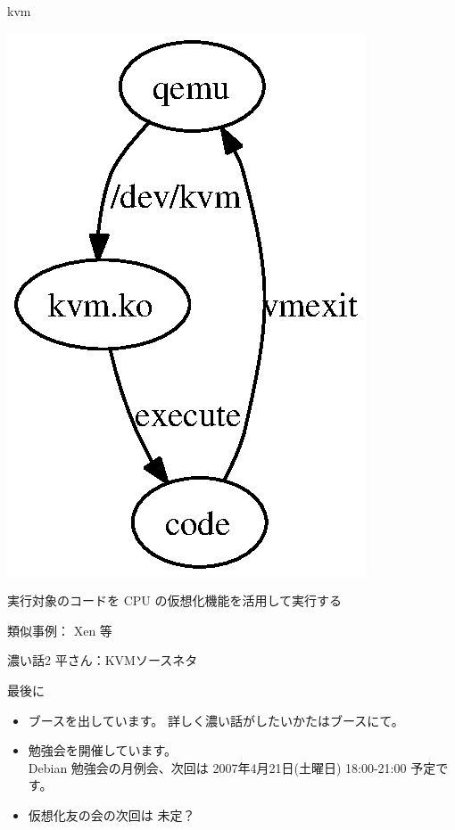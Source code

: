\documentclass[cjk,dvipdfmx]{beamer}
\begin{document}
\begin{frame}{kvm}
\begin{minipage}[]{0.4\hsize}
 \includegraphics[width=0.9\hsize]{image200703/kvm.eps}
\end{minipage}
\begin{minipage}[]{0.55\hsize}
 実行対象のコードを CPU の仮想化機能を活用して実行する

類似事例：
 Xen 等
\end{minipage}
\end{frame}

\begin{frame}{濃い話2}
 平さん：KVMソースネタ
\end{frame}

\begin{frame}{最後に}
 \begin{itemize}
  \item ブースを出しています。
	詳しく濃い話がしたいかたはブースにて。
  \item 勉強会を開催しています。\\
	Debian 勉強会の月例会、次回は
	2007年4月21日(土曜日) 18:00-21:00 予定です。
  \item	仮想化友の会の次回は
	未定？
 \end{itemize}
\end{frame}
\end{document}
